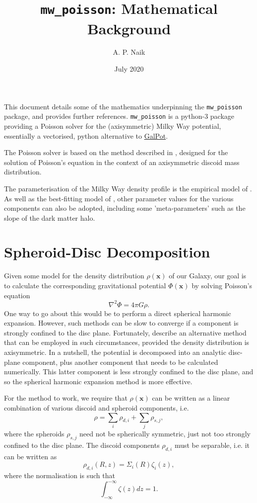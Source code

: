 \documentclass[11pt,a4paper]{article}
\title{\texttt{mw\_poisson}: Mathematical Background}
\author{A. P. Naik}
\date{July 2020}
\begin{document}
\maketitle


This document details some of the mathematics underpinning the \texttt{mw\_poisson} package, and provides further references. \texttt{mw\_poisson} is a python-3 package providing a Poisson solver for the (axisymmetric) Milky Way potential, essentially a vectorised, python alternative to \href{https://github.com/PaulMcMillan-Astro/GalPot}{GalPot}.

The Poisson solver is based on the method described in \citet{Dehnen1998}, designed for the solution of Poisson's equation in the context of an axisymmetric discoid mass distribution.

The parameterisation of the Milky Way density profile is the empirical model of \citet{McMillan2017}. As well as the best-fitting model of \citet{McMillan2017}, other parameter values for the various components can also be adopted, including some 'meta-parameters' such as the slope of the dark matter halo.


\section{Spheroid-Disc Decomposition}

Given some model for the density distribution $\rho(\bm{x})$ of our Galaxy, our goal is to calculate the corresponding gravitational potential $\Phi(\bm{x})$ by solving Poisson's equation
\begin{equation}
    \nabla^2 \Phi = 4\pi G \rho.
\end{equation}
One way to go about this would be to perform a direct spherical harmonic expansion. However, such methods can be slow to converge if a component is strongly confined to the disc plane. Fortunately, \citet{Dehnen1998} describe an alternative method that can be employed in such circumstances, provided the density distribution is axisymmetric. In a nutshell, the potential is decomposed into an analytic disc-plane component, plus another component that needs to be calculated numerically. This latter component is less strongly confined to the disc plane, and so the spherical harmonic expansion method is more effective.

For the method to work, we require that $\rho(\bm{x})$ can be written as a linear combination of various discoid and spheroid components, i.e.
\begin{equation}
    \rho = \sum_i \rho_{d,i} + \sum_j \rho_{s,j},
\end{equation}
where the spheroids $\rho_{s,j}$ need not be spherically symmetric, just not too strongly confined to the disc plane. The discoid components $\rho_{d,i}$ must be separable, i.e. it can be written as
\begin{equation}
\label{E:rho_disc}
    \rho_{d,i}(R,z) = \Sigma_i(R)\zeta_i(z),
\end{equation}
where the normalisation is such that
\begin{equation}
\label{E:zeta_norm}
    \int_{-\infty}^{-\infty} \zeta(z) dz = 1.
\end{equation}
\end{document}
